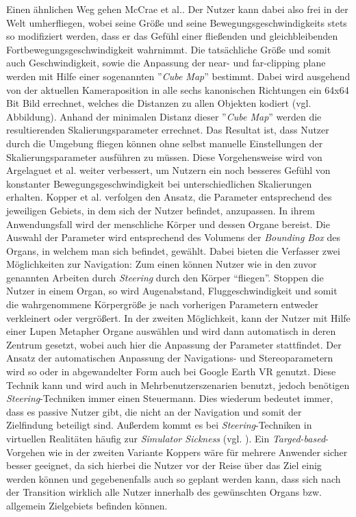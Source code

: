Einen ähnlichen Weg gehen McCrae et al.\cite{McCrae2009MultiscaleNavigation}.
Der Nutzer kann dabei also frei in der Welt umherfliegen, wobei seine Größe und seine Bewegungsgeschwindigkeits stets so modifiziert werden, dass er das Gefühl einer fließenden und gleichbleibenden Fortbewegungsgeschwindigkeit wahrnimmt. 
Die tatsächliche Größe und somit auch Geschwindigkeit, sowie die Anpassung der near- und far-clipping plane werden mit Hilfe einer sogenannten ”\textit{Cube Map}” bestimmt. Dabei wird ausgehend von der aktuellen Kameraposition in alle sechs kanonischen Richtungen ein 64x64 Bit Bild errechnet, welches die Distanzen zu allen Objekten kodiert (vgl. Abbildung). Anhand der minimalen Distanz dieser ”\textit{Cube Map}” werden die resultierenden Skalierungsparameter errechnet.
Das Resultat ist, dass Nutzer durch die Umgebung fliegen können ohne selbst manuelle Einstellungen der Skalierungsparameter ausführen zu müssen. Diese Vorgehensweise wird von Argelaguet et al. \cite{Dallat2018Giant} weiter verbessert, um Nutzern ein noch besseres Gefühl von konstanter Bewegungsgeschwindigkeit bei unterschiedlichen Skalierungen erhalten.
Kopper et al. \cite{Kopper2006DesignEnvironments} verfolgen den Ansatz, die Parameter entsprechend des jeweiligen Gebiets, in dem sich der Nutzer befindet, anzupassen. In ihrem Anwendungsfall wird der menschliche Körper und dessen Organe bereist. Die Auswahl der Parameter wird entsprechend des Volumens der \textit{Bounding Box} des Organs, in welchem man sich befindet, gewählt. Dabei bieten die Verfasser zwei Möglichkeiten zur Navigation: Zum einen können Nutzer wie in den zuvor genannten Arbeiten durch \textit{Steering} durch den Körper “fliegen”. Stoppen die Nutzer in einem Organ, so wird Augenabstand, Fluggeschwindigkeit und somit die wahrgenommene Körpergröße je nach vorherigen Parametern entweder verkleinert oder vergrößert. In der zweiten Möglichkeit, kann der Nutzer mit Hilfe einer Lupen Metapher Organe auswählen und wird dann automatisch in deren Zentrum gesetzt, wobei auch hier die Anpassung der Parameter stattfindet.
Der Ansatz der automatischen Anpassung der Navigations- und Stereoparametern wird so oder in abgewandelter Form auch bei Google Earth VR genutzt. Diese Technik kann und wird auch in Mehrbenutzerszenarien benutzt, jedoch benötigen \textit{Steering}-Techniken immer einen Steuermann. Dies wiederum bedeutet immer, dass es passive Nutzer gibt, die nicht an der Navigation und somit der Zielfindung beteiligt sind. Außerdem kommt es bei \textit{Steering}-Techniken in virtuellen Realitäten häufig zur \textit{Simulator Sickness} (vgl. \cite{Lackner2014MotionVomiting}).
Ein \textit{Targed-based}-Vorgehen wie in der zweiten Variante Koppers wäre für mehrere Anwender sicher besser geeignet, da sich hierbei die Nutzer vor der Reise über das Ziel einig werden können und gegebenenfalls auch so geplant werden kann, dass sich nach der Transition wirklich alle Nutzer innerhalb des gewünschten Organs bzw. allgemein Zielgebiets befinden können.

